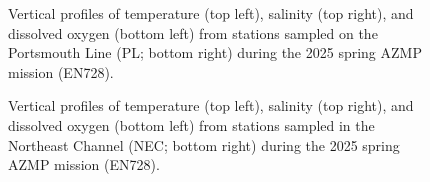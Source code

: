 \documentclass[12pt]{article}\usepackage[]{graphicx}\usepackage[]{color}
\begin{document}
\begin{appendices}
\begin{figure}[htb]
{}

\caption{Vertical profiles of temperature (top left), salinity (top right), and dissolved oxygen (bottom left) from stations sampled on the Portsmouth Line (PL; bottom right) during the 2025 spring AZMP mission (EN728).}\label{fig:figureA6}
\end{figure}
\clearpage
\begin{figure}[htb]

{\centering {} 

}

\caption{Vertical profiles of temperature (top left), salinity (top right), and dissolved oxygen (bottom left) from stations sampled in the Northeast Channel (NEC; bottom right) during the 2025 spring AZMP mission (EN728).}\label{fig:figureA7}
\end{figure}
\clearpage
\begin{figure}[htb]

{\centering {} 

}
\end{figure}
\end{appendices}
\end{document}
